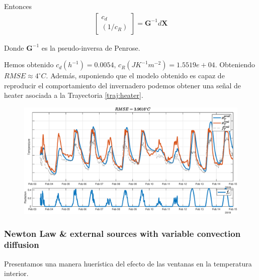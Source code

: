     Entonces 
    \begin{gather}
        \begin{bmatrix}
            c_d \\ (1/c_R)
        \end{bmatrix} =  \bm{G}^{-1}d\bm{X}
    \end{gather}
    
    Donde $\bm{G}^{-1}$ es la pseudo-inversa de Penrose. 
    \newline
    
    Hemos obtenido $c_d(h^{-1}) = 0.0054$, $ c_R(JK^{-1}m^{-2}) = 1.5519e+04$. Obteniendo $RMSE \approx 4 ^\circ C$. Además, suponiendo que el modelo obtenido es capaz de reproducir el comportamiento del invernadero podemos obtener una señal de heater asociada a la Trayectoria \ref{traj:heater}.
    
    
    \begin{figure}
        \centering
        \includegraphics[scale=0.5]{img/model-2.1.1.eps}
    \end{figure}
    
    
    \subsubsection{Newton Law \& external sources with variable convection diffusion}
    Presentamos una manera huerística del efecto de las ventanas en la temperatura interior.
    
    
    
